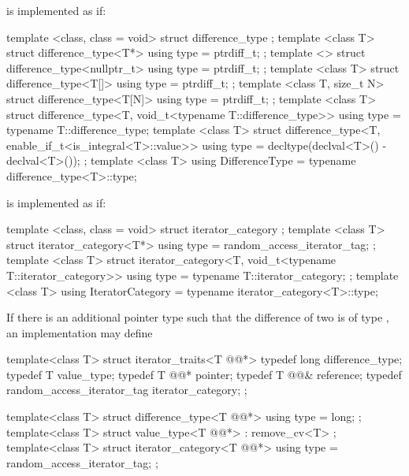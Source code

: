 \begin{addedblock}
\pnum
{} is implemented as if:

\begin{codeblock}
  template <class, class = void> struct difference_type { };
  template <class T> struct difference_type<T*> {
    using type = ptrdiff_t;
  };
  template <> struct difference_type<nullptr_t> {
    using type = ptrdiff_t;
  };
  template <class T> struct difference_type<T[]> {
    using type = ptrdiff_t;
  };
  template <class T, size_t N> struct difference_type<T[N]> {
    using type = ptrdiff_t;
  };
  template <class T>
  struct difference_type<T, void_t<typename T::difference_type>> {
    using type = typename T::difference_type;
  }
  template <class T>
  struct difference_type<T, enable_if_t<is_integral<T>::value>> {
    using type = decltype(declval<T>() - declval<T>());
  };
  template <class T>
    using DifferenceType = typename difference_type<T>::type;
\end{codeblock}

\pnum
{} is implemented as if:

\begin{codeblock}
  template <class, class = void> struct iterator_category { };
  template <class T> struct iterator_category<T*> {
    using type = random_access_iterator_tag;
  };
  template <class T>
  struct iterator_category<T, void_t<typename T::iterator_category>> {
    using type = typename T::iterator_category;
  };
  template <class T>
    using IteratorCategory = typename iterator_category<T>::type;
\end{codeblock}
\end{addedblock}

\pnum
\enternote
If there is an additional pointer type
such that the difference of two
is of type
,
an implementation may define

\begin{removedblock}
\begin{codeblock}
  template<class T> struct iterator_traits<T @@*> {
    typedef long difference_type;
    typedef T value_type;
    typedef T @@* pointer;
    typedef T @@& reference;
    typedef random_access_iterator_tag iterator_category;
  };
\end{codeblock}
\end{removedblock}
\begin{addedblock}
\begin{codeblock}
  template<class T> struct difference_type<T @@*> {
    using type = long;
  };
  template<class T> struct value_type<T @@*> : remove_cv<T> { };
  template<class T> struct iterator_category<T @@*> {
    using type = random_access_iterator_tag;
  };
\end{codeblock}
\end{addedblock}
\exitnote

